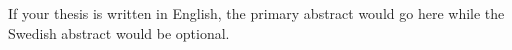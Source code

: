 If your thesis is written in English, the primary abstract would go here while the Swedish abstract would be optional.
